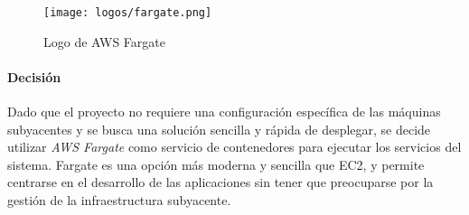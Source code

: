 \begin{figure}[H]
	\centering
	\texttt{[image: logos/fargate.png]}
	\caption{Logo de AWS Fargate~\textregistered}
	\label{fig:fargate}
\end{figure}

\paragraph{Decisión}
Dado que el proyecto no requiere una configuración específica de las máquinas
subyacentes y se busca una solución sencilla y rápida de desplegar, se decide
utilizar \textit{AWS Fargate} como servicio de contenedores para ejecutar los
servicios del sistema. Fargate es una opción más moderna y sencilla que EC2, y
permite centrarse en el desarrollo de las aplicaciones sin tener que preocuparse
por la gestión de la infraestructura subyacente.
